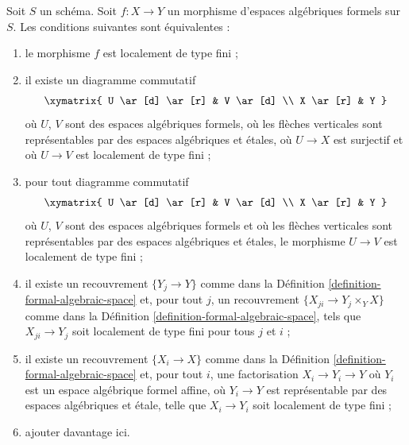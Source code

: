 \begin{lemma}
\label{lemma-finite-type-local}
Soit $S$ un schéma. Soit $f : X \to Y$ un morphisme d'espaces algébriques formels
sur $S$. Les conditions suivantes sont équivalentes :
\begin{enumerate}
\item le morphisme $f$ est localement de type fini ;
\item il existe un diagramme commutatif
$$
\xymatrix{
U \ar[d] \ar[r] & V \ar[d] \\
X \ar[r] & Y
}
$$
où $U$, $V$ sont des espaces algébriques formels, où les flèches verticales sont
représentables par des espaces algébriques et étales, où $U \to X$
est surjectif et où $U \to V$ est localement de type fini ;
\item pour tout diagramme commutatif
$$
\xymatrix{
U \ar[d] \ar[r] & V \ar[d] \\
X \ar[r] & Y
}
$$
où $U$, $V$ sont des espaces algébriques formels et où les flèches verticales
sont représentables par des espaces algébriques et étales, le morphisme
$U \to V$ est localement de type fini ;
\item il existe un recouvrement $\{Y_j \to Y\}$ comme dans la
Définition \ref{definition-formal-algebraic-space}
et, pour tout $j$, un recouvrement $\{X_{ji} \to Y_j \times_Y X\}$ comme dans la
Définition \ref{definition-formal-algebraic-space}, tels que
$X_{ji} \to Y_j$ soit localement de type fini pour tous $j$ et $i$ ;
\item il existe un recouvrement $\{X_i \to X\}$ comme dans la
Définition \ref{definition-formal-algebraic-space}
et, pour tout $i$, une factorisation $X_i \to Y_i \to Y$ où $Y_i$
est un espace algébrique formel affine, où $Y_i \to Y$ est représentable
par des espaces algébriques et étale, telle que $X_i \to Y_i$ soit
localement de type fini ;
\item ajouter davantage ici.
\end{enumerate}
\end{lemma}

